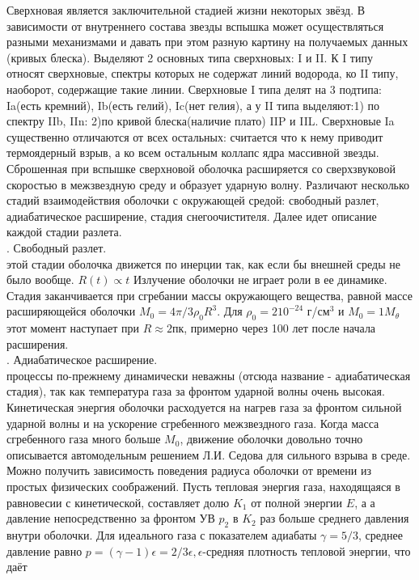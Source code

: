 \documentclass[a4paper,12pt]{extarticle}
\begin{document}
Сверхновая является заключительной стадией жизни некоторых звёзд.{\cite{Shklov1984}} В зависимости от внутреннего состава звезды вспышка может осуществляться разными механизмами и давать при этом разную картину на получаемых данных (кривых блеска). Выделяют 2 основных типа сверхновых: I и II. К I типу относят сверхновые, спектры которых не содержат линий водорода, ко II типу, наоборот, содержащие такие линии. Сверхновые I типа делят на 3 подтипа: Ia(есть кремний), Ib(есть гелий), Ic(нет гелия), а у II типа выделяют:1) по спектру IIb, IIn: 2)по кривой блеска(наличие плато) IIP и IIL. Сверхновые Ia существенно отличаются от всех остальных: считается что к нему приводит термоядерный взрыв, а ко всем остальным коллапс ядра массивной звезды.\\
\indent Сброшенная при вспышке сверхновой оболочка расширяется со сверхзвуковой скоростью в межзвездную среду и образует ударную волну. Различают несколько стадий взаимодействия оболочки с окружающей средой: свободный разлет, адиабатическое расширение, стадия снегоочистителя. Далее идет описание каждой стадии разлета.{\cite{Spitzer1981}}\\
. Свободный разлет.\\
 этой стадии оболочка движется по инерции так, как если бы внешней среды не было вообще. $R(t)\propto t $ Излучение оболочки не играет роли в ее динамике. Стадия заканчивается при сгребании массы окружающего вещества, равной массе расширяющейся оболочки $M_0 = 4\pi/3\rho_0R^3$. Для $\rho_0=210^{-24}$ г/см$^3$ и $M_0=1M_{\theta}$ этот момент наступает при $R\approx 2$пк, примерно через 100 лет после начала расширения.\\
. Адиабатическое расширение. \\
 процессы по-прежнему динамически неважны (отсюда название - адиабатическая стадия), так как температура газа за фронтом ударной волны очень высокая. Кинетическая энергия оболочки расходуется на нагрев газа за фронтом сильной ударной волны и на ускорение сгребенного межзвездного газа. Когда масса сгребенного газа много больше $M_0$, движение оболочки довольно точно описывается автомодельным решением Л.И. Седова для сильного взрыва в среде. Можно получить зависимость поведения радиуса оболочки от времени из простых физических соображений. 
Пусть тепловая энергия газа, находящаяся в равновесии с кинетической, составляет долю $K_1$ от полной энергии $E$, а а давление непосредственно за фронтом УВ $p_2$ в $K_2$ раз больше среднего давления внутри оболочки. Для идеального газа с показателем адиабаты $\gamma=5/3$, среднее давление равно $p=(\gamma-1)\epsilon=2/3\epsilon, \epsilon$-средняя плотность тепловой энергии, что даёт 
\end{document}
